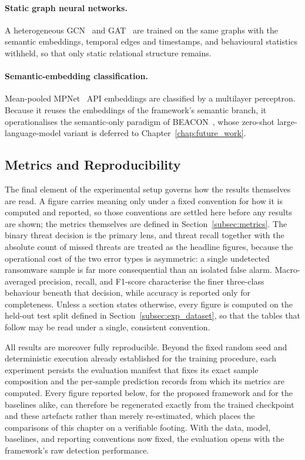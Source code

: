 \documentclass[%
    BCOR=10mm,
    DIV=13,
    toc=bibliography,
    toc=listof,
    oneside,
    12pt,
]{scrbook}
\begin{document}
\paragraph{Static graph neural networks.} A heterogeneous
GCN~\cite{kipf2017gcn} and GAT~\cite{velickovic2018gat} are trained on the same
graphs with the semantic embeddings, temporal edges and timestamps, and
behavioural statistics withheld, so that only static relational structure
remains.

\paragraph{Semantic-embedding classification.} Mean-pooled
MPNet~\cite{mpnet2020} API embeddings are classified by a multilayer
perceptron. Because it reuses the embeddings of the framework's semantic branch,
it operationalises the semantic-only paradigm of BEACON~\cite{perera2023beacon},
whose zero-shot large-language-model variant is deferred to
Chapter~\ref{chap:future_work}.


\subsection{Metrics and Reproducibility}
\label{subsec:exp_metrics}

The final element of the experimental setup governs how the results themselves are
read. A figure carries meaning only under a fixed convention for how it is computed
and reported, so those conventions are settled here before any results are shown;
the metrics themselves are defined in Section~\ref{subsec:metrics}. The binary
threat decision is the primary lens, and threat recall together with the absolute count of missed
threats are treated as the headline figures, because the operational cost of the
two error types is asymmetric: a single undetected ransomware sample is far more
consequential than an isolated false alarm. Macro-averaged precision, recall, and
F1-score characterise the finer three-class behaviour beneath that decision,
while accuracy is reported only for completeness. Unless a section states otherwise, every figure is computed
on the held-out test split defined in Section~\ref{subsec:exp_dataset}, so that
the tables that follow may be read under a single, consistent convention.

All results are moreover fully reproducible. Beyond the fixed random seed and
deterministic execution already established for the training procedure, each
experiment persists the evaluation manifest that fixes its exact sample
composition and the per-sample prediction records from which its metrics are
computed. Every figure reported below, for the proposed framework and for the
baselines alike, can therefore be regenerated exactly from the trained checkpoint
and these artefacts rather than merely re-estimated, which places the comparisons
of this chapter on a verifiable footing. With the data, model, baselines, and
reporting conventions now fixed, the evaluation opens with the framework's raw
detection performance.
\end{document}
